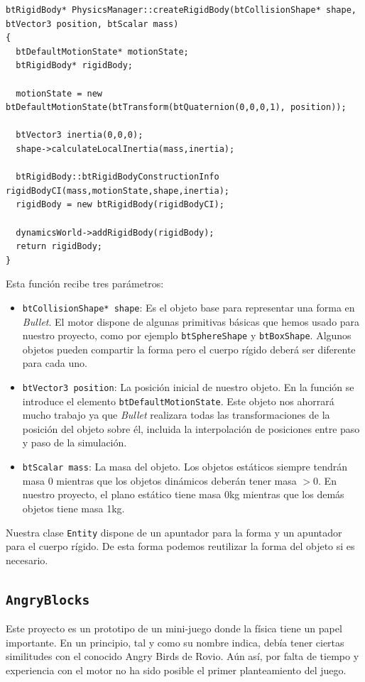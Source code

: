 \documentclass[12pt]{article}
\begin{document}
{\scriptsize
\begin{verbatim}
btRigidBody* PhysicsManager::createRigidBody(btCollisionShape* shape, btVector3 position, btScalar mass)
{
  btDefaultMotionState* motionState;
  btRigidBody* rigidBody;

  motionState = new btDefaultMotionState(btTransform(btQuaternion(0,0,0,1), position));

  btVector3 inertia(0,0,0);
  shape->calculateLocalInertia(mass,inertia);

  btRigidBody::btRigidBodyConstructionInfo rigidBodyCI(mass,motionState,shape,inertia);
  rigidBody = new btRigidBody(rigidBodyCI);

  dynamicsWorld->addRigidBody(rigidBody);
  return rigidBody;
}
\end{verbatim}
}

Esta función recibe tres parámetros:
\begin{itemize}
  \item \texttt{btCollisionShape* shape}: Es el objeto base para representar una forma en \textit{Bullet}. El motor dispone de algunas primitivas básicas que hemos usado para nuestro proyecto, como por ejemplo \texttt{btSphereShape} y \texttt{btBoxShape}. Algunos objetos pueden compartir la forma pero el cuerpo rígido deberá ser diferente para cada uno.
  \item \texttt{btVector3 position}: La posición inicial de nuestro objeto. En la función se introduce el elemento \texttt{btDefaultMotionState}. Este objeto nos ahorrará mucho trabajo ya que \textit{Bullet} realizara todas las transformaciones de la posición del objeto sobre él, incluida la interpolación de posiciones entre paso y paso de la simulación.
  \item \texttt{btScalar mass}: La masa del objeto. Los objetos estáticos siempre tendrán masa 0 mientras que los objetos dinámicos deberán tener masa $>0$. En nuestro proyecto, el plano estático tiene masa 0kg mientras que los demás objetos tiene masa 1kg.
\end{itemize}

Nuestra clase \texttt{Entity} dispone de un apuntador para la forma y un apuntador para el cuerpo rígido. De esta forma podemos reutilizar la forma del objeto si es necesario.

\subsection{\texttt{AngryBlocks}}

Este proyecto es un prototipo de un mini-juego donde la física tiene un papel importante. En un principio, tal y como su nombre indica, debía tener ciertas similitudes con el conocido Angry Birds de Rovio. Aún así, por falta de tiempo y experiencia con el motor no ha sido posible el primer planteamiento del juego.
\end{document}
